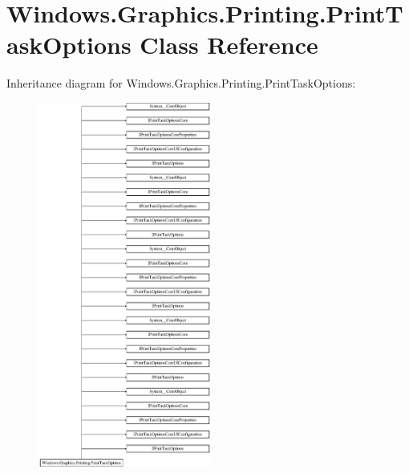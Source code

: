\hypertarget{class_windows_1_1_graphics_1_1_printing_1_1_print_task_options}{}\section{Windows.\+Graphics.\+Printing.\+Print\+Task\+Options Class Reference}
\label{class_windows_1_1_graphics_1_1_printing_1_1_print_task_options}
Inheritance diagram for Windows.\+Graphics.\+Printing.\+Print\+Task\+Options\+:\begin{figure}[H]
\begin{center}
\leavevmode
\includegraphics[height=12.000000cm]{class_windows_1_1_graphics_1_1_printing_1_1_print_task_options}
\end{center}
\end{figure}
